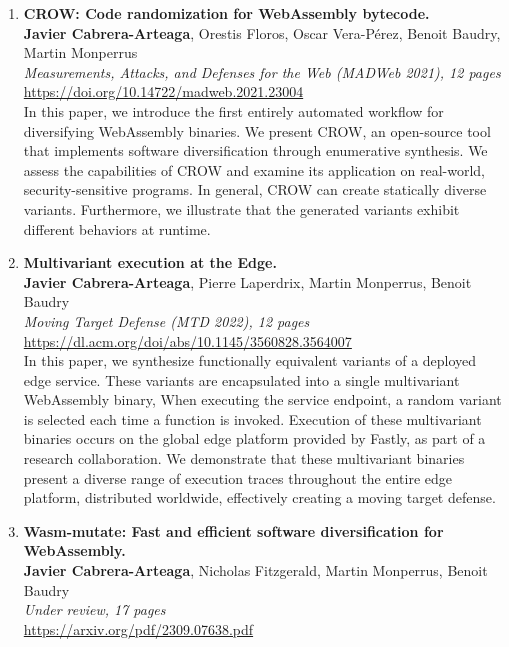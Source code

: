 \begin{enumerate}[label={\textbf{P\arabic*}:}, ref={P\arabic*}]
	\item \label{crowpaper} \textbf{CROW: Code randomization for WebAssembly bytecode.} \\ 
	\textbf{Javier Cabrera-Arteaga}, Orestis Floros, Oscar Vera-Pérez, Benoit Baudry, Martin Monperrus\\
	\textit{ Measurements, Attacks, and Defenses for the Web (MADWeb 2021), 12 pages} \\
	\url{https://doi.org/10.14722/madweb.2021.23004} \\
	
	 In this paper, we introduce the first entirely automated workflow for diversifying WebAssembly binaries. 
	We present CROW, an open-source tool that implements software diversification through enumerative synthesis. 
	We assess the capabilities of CROW and examine its application on real-world, security-sensitive programs.
	In general, CROW can create statically diverse variants. 
	Furthermore, we illustrate that the generated variants exhibit different behaviors at runtime.

	
	
	\item \label{mewepaper} \textbf{Multivariant execution at the Edge. } \\
	\textbf{Javier Cabrera-Arteaga}, Pierre Laperdrix, Martin Monperrus, Benoit Baudry\\
    \textit{Moving Target Defense (MTD 2022), 12 pages} \\
    \url{https://dl.acm.org/doi/abs/10.1145/3560828.3564007} \\

	In this paper, we synthesize functionally equivalent variants of a deployed edge service. 
	These variants are encapsulated into a single multivariant WebAssembly binary, 
	When executing the service endpoint, a random variant is selected each time a function is invoked.
	Execution of these multivariant binaries occurs on the global edge platform provided by Fastly, as part of a research collaboration. 
	We demonstrate that these multivariant binaries present a diverse range of execution traces throughout the entire edge platform, distributed worldwide, effectively creating a moving target defense.

	
	\item \label{wasmmutatepaper}\textbf{Wasm-mutate: Fast and efficient software diversification for WebAssembly. }\\ 
	\textbf{Javier Cabrera-Arteaga}, Nicholas Fitzgerald, Martin Monperrus, Benoit Baudry\\
	\textit{Under review, 17 pages} \\
	\url{https://arxiv.org/pdf/2309.07638.pdf}


\end{enumerate}
